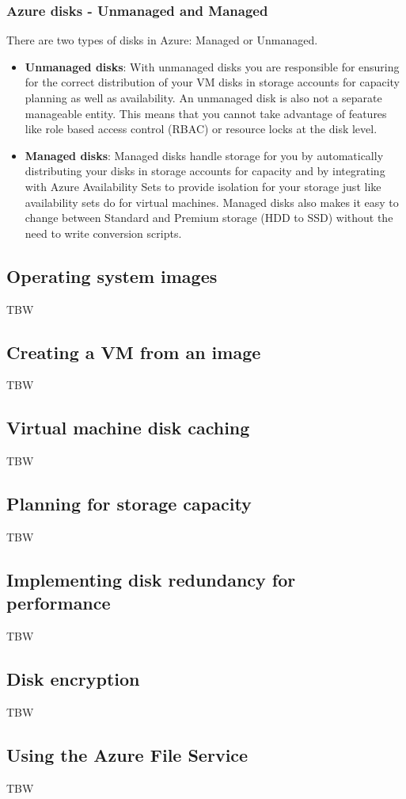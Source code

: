 \documentclass[12pt]{article}
\begin{document}
\subsubsection{Azure disks - Unmanaged and Managed}
There are two types of disks in Azure: Managed or Unmanaged.
\begin{itemize}
    \item \textbf{Unmanaged disks}: With unmanaged disks you are responsible for ensuring for the correct distribution of your VM disks in storage accounts for capacity planning as well as availability. An unmanaged disk is also not a separate manageable entity. This means that you cannot take advantage of features like role based access control (RBAC) or resource locks at the disk level.
    \item \textbf{Managed disks}: Managed disks handle storage for you by automatically distributing your disks in storage accounts for capacity and by integrating with Azure Availability Sets to provide isolation for your storage just like availability sets do for virtual machines. Managed disks also makes it easy to change between Standard and Premium storage (HDD to SSD) without the need to write conversion scripts.
\end{itemize}

\subsection{Operating system images}
TBW

\subsection{Creating a VM from an image}
TBW

\subsection{Virtual machine disk caching}
TBW

\subsection{Planning for storage capacity}
TBW

\subsection{Implementing disk redundancy for performance}
TBW

\subsection{Disk encryption}
TBW

\subsection{Using the Azure File Service}
TBW
\end{document}
